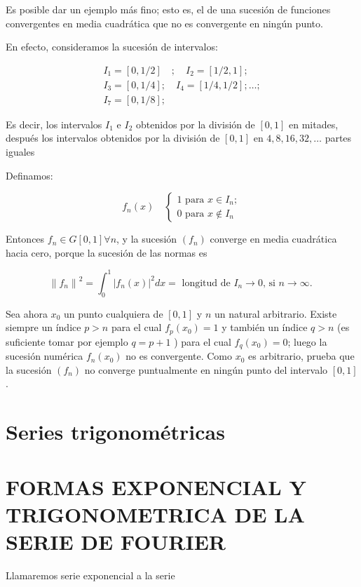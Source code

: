 \documentclass[10pt]{article}
\theoremstyle{plain}
\theoremstyle{definition}
\theoremstyle{remark}
\begin{document}
Es posible dar un ejemplo más fino; esto es, el de una sucesión de funciones convergentes en media cuadrática que no es convergente en ningún punto.

En efecto, consideramos la sucesión de intervalos:

$$
\begin{array}{ll}
I_{1}=[0,1 / 2] \quad ; \quad I_{2}=[1 / 2,1] ; \\
I_{3}=[0,1 / 4] ; \quad I_{4}=[1 / 4,1 / 2] ; \ldots ; \\
I_{7}=[0,1 / 8] ;
\end{array}
$$

Es decir, los intervalos $I_{1}$ e $I_{2}$ obtenidos por la división de $[0,1]$ en mitades, después los intervalos obtenidos por la división de $[0,1]$ en $4,8,16,32, \ldots$ partes iguales

Definamos:

$$
f_{n}(x) \quad\left\{\begin{array}{l}
1 \text { para } x \in I_{n} ; \\
0 \text { para } x \notin I_{n}
\end{array}\right.
$$

Entonces $f_{n} \in G[0,1] \forall n$, y la sucesión $\left(f_{n}\right)$ converge en media cuadrática hacia cero, porque la sucesión de las normas es

$$
\left\|f_{n}\right\|^{2}=\int_{0}^{1}\left|f_{n}(x)\right|^{2} d x=\text { longitud de } I_{n} \rightarrow 0 \text {, si } n \rightarrow \infty \text {. }
$$

Sea ahora $x_{0}$ un punto cualquiera de $[0,1]$ y $n$ un natural arbitrario. Existe siempre un índice $p>n$ para el cual $f_{p}\left(x_{0}\right)=1$ y también un índice $q>n$ (es suficiente tomar por ejemplo $q=p+1$ ) para el cual $f_{q}\left(x_{0}\right)=0$; luego la sucesión numérica $f_{n}\left(x_{0}\right)$ no es convergente. Como $x_{0}$ es arbitrario, prueba que la sucesión $\left(f_{n}\right)$ no converge puntualmente en ningún punto del intervalo $[0,1]$.

\section{Series trigonométricas}
\section*{FORMAS EXPONENCIAL Y TRIGONOMETRICA DE LA SERIE DE FOURIER}
Llamaremos serie exponencial a la serie
\end{document}
